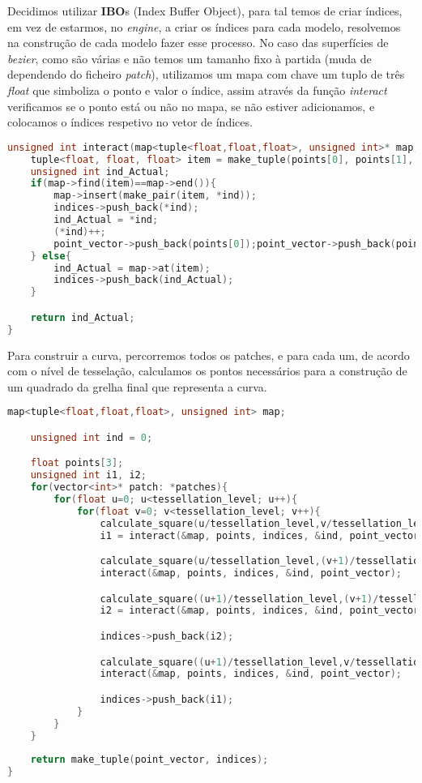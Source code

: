 \documentclass[14pt, a4 paper]{report}
\begin{document}
Decidimos utilizar \textbf{IBO}s (Index Buffer Object), para tal temos de criar índices, em vez de estarmos, no \textit{engine}, a criar os índices para cada modelo, resolvemos na construção de cada modelo fazer esse processo.
No caso das superfícies de \textit{bezier}, como são várias e não temos um tamanho fixo à partida (muda de dependendo do ficheiro \textit{patch}), utilizamos um mapa com chave um tuplo de três \textit{float} que simboliza o ponto e valor o índice, assim através da função \textit{interact} verificamos se o ponto está ou não no mapa, se não estiver adicionamos, e colocamos o índices respetivo no vetor de índices.
\begin{lstlisting}[language=c++]
unsigned int interact(map<tuple<float,float,float>, unsigned int>* map, float* points, vector<unsigned int>* indices, unsigned int* ind, vector<float>* point_vector){
    tuple<float, float, float> item = make_tuple(points[0], points[1], points[2]);
    unsigned int ind_Actual;
    if(map->find(item)==map->end()){
        map->insert(make_pair(item, *ind));
        indices->push_back(*ind);
        ind_Actual = *ind;
        (*ind)++;
        point_vector->push_back(points[0]);point_vector->push_back(points[1]);point_vector->push_back(points[2]);
    } else{
        ind_Actual = map->at(item);
        indices->push_back(ind_Actual);
    }

    return ind_Actual;
}
\end{lstlisting}

Para construir a curva, percorremos todos os patches, e para cada um, de acordo com o nível de tesselação, calculamos os pontos necessários para a construção de um quadrado da grelha final que representa a curva.
\begin{lstlisting}[language=c++]
map<tuple<float,float,float>, unsigned int> map;

    unsigned int ind = 0;

    float points[3];
    unsigned int i1, i2;
    for(vector<int>* patch: *patches){
        for(float u=0; u<tessellation_level; u++){
            for(float v=0; v<tessellation_level; v++){
                calculate_square(u/tessellation_level,v/tessellation_level, patch, cpoints, points);
                i1 = interact(&map, points, indices, &ind, point_vector);

                calculate_square(u/tessellation_level,(v+1)/tessellation_level, patch, cpoints, points);
                interact(&map, points, indices, &ind, point_vector);

                calculate_square((u+1)/tessellation_level,(v+1)/tessellation_level, patch, cpoints, points);
                i2 = interact(&map, points, indices, &ind, point_vector);

                indices->push_back(i2);

                calculate_square((u+1)/tessellation_level,v/tessellation_level, patch, cpoints, points);
                interact(&map, points, indices, &ind, point_vector);

                indices->push_back(i1);
            }
        }
    }
    
    return make_tuple(point_vector, indices);
}
\end{lstlisting}
\end{document}
